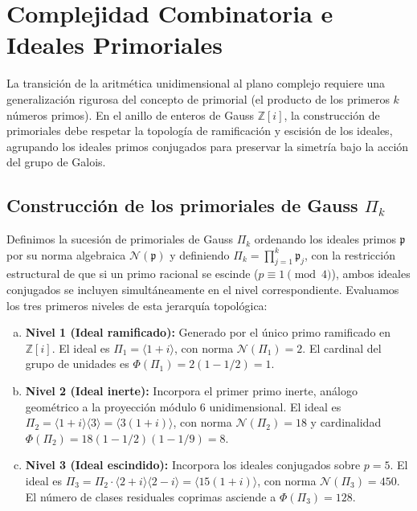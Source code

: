\documentclass{article}
\numberwithin{equation}{section}
\theoremstyle{plain}
\theoremstyle{definition}
\begin{document}
\section{Complejidad Combinatoria e Ideales Primoriales}
\label{sec:entropia}

La transición de la aritmética unidimensional al plano complejo requiere una generalización rigurosa del concepto de primorial (el producto de los primeros $k$ números primos). En el anillo de enteros de Gauss $\mathbb{Z}[i]$, la construcción de primoriales debe respetar la topología de ramificación y escisión de los ideales, agrupando los ideales primos conjugados para preservar la simetría bajo la acción del grupo de Galois.

\subsection{Construcción de los primoriales de Gauss \texorpdfstring{$\Pi_k$}{Pi\_k}}

Definimos la sucesión de primoriales de Gauss $\Pi_k$ ordenando los ideales primos $\mathfrak{p}$ por su norma algebraica $\mathcal{N}(\mathfrak{p})$ y definiendo $\Pi_k = \prod_{j=1}^k \mathfrak{p}_j$, con la restricción estructural de que si un primo racional se escinde ($p \equiv 1 \pmod 4$), ambos ideales conjugados se incluyen simultáneamente en el nivel correspondiente. Evaluamos los tres primeros niveles de esta jerarquía topológica:

\begin{enumerate}[(a)]
    \item \textbf{Nivel 1 (Ideal ramificado):} Generado por el único primo ramificado en $\mathbb{Z}[i]$. El ideal es $\Pi_1 = \langle 1+i \rangle$, con norma $\mathcal{N}(\Pi_1) = 2$. El cardinal del grupo de unidades es $\Phi(\Pi_1) = 2 (1 - 1/2) = 1$.
    \item \textbf{Nivel 2 (Ideal inerte):} Incorpora el primer primo inerte, análogo geométrico a la proyección módulo $6$ unidimensional. El ideal es $\Pi_2 = \langle 1+i \rangle \langle 3 \rangle = \langle 3(1+i) \rangle$, con norma $\mathcal{N}(\Pi_2) = 18$ y cardinalidad $\Phi(\Pi_2) = 18 (1 - 1/2)(1 - 1/9) = 8$.
    \item \textbf{Nivel 3 (Ideal escindido):} Incorpora los ideales conjugados sobre $p=5$. El ideal es $\Pi_3 = \Pi_2 \cdot \langle 2+i \rangle \langle 2-i \rangle = \langle 15(1+i) \rangle$, con norma $\mathcal{N}(\Pi_3) = 450$. El número de clases residuales coprimas asciende a $\Phi(\Pi_3) = 128$.
\end{enumerate}
\end{document}
